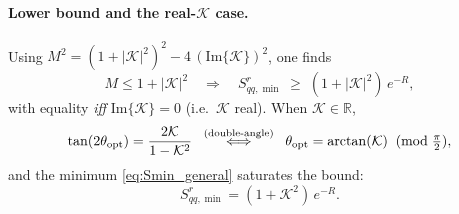 \paragraph{Lower bound and the real-\(\mathcal{K}\) case.}
Using \(M^{2}=(1+|\mathcal{K}|^{2})^{2}-4\,(\mathrm{Im}\{\mathcal{K}\})^{2}\), one finds
\[
M \le 1+|\mathcal{K}|^{2} \quad\Longrightarrow\quad
S^{r}_{qq,\min} \;\ge\; (1+|\mathcal{K}|^{2})\,e^{-R},
\]
with equality \emph{iff} \(\mathrm{Im}\{\mathcal{K}\}=0\) (i.e.\ \(\mathcal{K}\) real).  
When \(\mathcal{K}\in\mathbb{R}\),
\[
\tan(2\theta_{\rm opt})=\frac{2\mathcal{K}}{1-\mathcal{K}^{2}}
\;\;\stackrel{\text{(double-angle)}}{\Longleftrightarrow}\;\;
\theta_{\rm opt}=\arctan(\mathcal{K}) \; \; (\mathrm{mod}\;\tfrac{\pi}{2}),
\]
and the minimum \eqref{eq:Smin_general} saturates the bound:
\[
S^{r}_{qq,\min}=(1+\mathcal{K}^{2})\,e^{-R}.
\]

